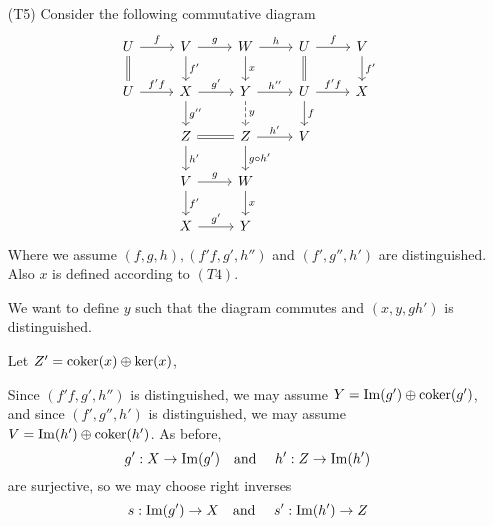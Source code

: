 \begin{exercise}[1]
\begin{enumerate}
\item[(T5)]
Consider the following commutative diagram 
\[ \begin{tikzcd}%
U \ar[r, "f"] \ar[d, equal] 
& V \ar[r, "g"] \ar[d, "f'"] 
& W \ar[r, "h"] \ar[d, "x"]  %
& U \ar[d, equal] \ar[r, "f"] 
& V \ar[d, "f'"] 
\\
U \ar[r, "f'f"]
& X \ar[r, "g'"] \ar[d, "g''"] 
& Y \ar[r, "h''"] \ar[d, "y", dashed]  %
& U \ar[d, "f"] \ar[r, "f'f"] 
& X 
\\
& Z \ar[r, equal] \ar[d, "h'"] 
& Z \ar[r, "h'"] \ar[d, "g\circ h'"] 
& V
\\
& V \ar[r, "g"] \ar[d, "f'"] 
& W \ar[d, "x"] 
\\
& X \ar[r, "g'"]
& Y 
\end{tikzcd} \]
Where we assume $(f,g,h), (f'f,g',h'')$ and $(f',g'',h')$ are distinguished.
Also $x$ is defined according to $(T4)$. 

We want to define $y$ such that the diagram commutes and $(x,y,gh')$ is
distinguished. 


Let $Z' = \operatorname{coker}(x)\oplus\ker(x)$, 


Since $(f'f, g', h'')$ is distinguished, we may assume $Y = \operatorname{Im}(g') \oplus
\operatorname{coker}(g')$, and since $(f',g'',h')$ is distinguished, we may assume $V =
\operatorname{Im}(h') \oplus \operatorname{coker}(h')$.
As before, 
\[ g' : X \to \operatorname{Im}(g') \quad\text{and }\quad h' : Z \to \operatorname{Im}(h') \]
are surjective, so we may choose right inverses 
\[ s : \operatorname{Im}(g') \to X \quad\text{and }\quad s' : \operatorname{Im}(h') \to Z \]


\end{enumerate}
\end{exercise}


